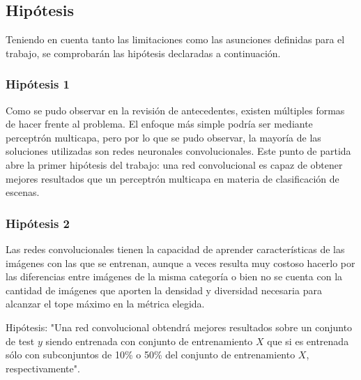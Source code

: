 \subsection{Hipótesis}
Teniendo en cuenta tanto las limitaciones como las asunciones definidas para el trabajo, se comprobarán las hipótesis declaradas a continuación. 

\subsubsection{Hipótesis 1} \label{sssec:hipotesis1}
Como se pudo observar en la revisión de antecedentes, existen múltiples formas de hacer frente al problema. El enfoque más simple podría ser mediante perceptrón multicapa, pero por lo que se pudo observar, la mayoría de las soluciones utilizadas son redes neuronales convolucionales. Este punto de partida abre la primer hipótesis del trabajo: una red convolucional es capaz de obtener mejores resultados que un perceptrón multicapa en materia de clasificación de escenas.

\subsubsection{Hipótesis 2} \label{sssec:hipotesis2}
Las redes convolucionales tienen la capacidad de aprender características de las imágenes con las que se entrenan, aunque a veces resulta muy costoso hacerlo por las diferencias entre imágenes de la misma categoría o bien no se cuenta con la cantidad de imágenes que aporten la densidad y diversidad necesaria para alcanzar el tope máximo en la métrica elegida. 

Hipótesis: "Una red convolucional obtendrá mejores resultados sobre un conjunto de test \(y\) siendo entrenada con conjunto de entrenamiento \(X\) que si es entrenada sólo con subconjuntos de 10\% o 50\% del conjunto de entrenamiento \(X\), respectivamente".


